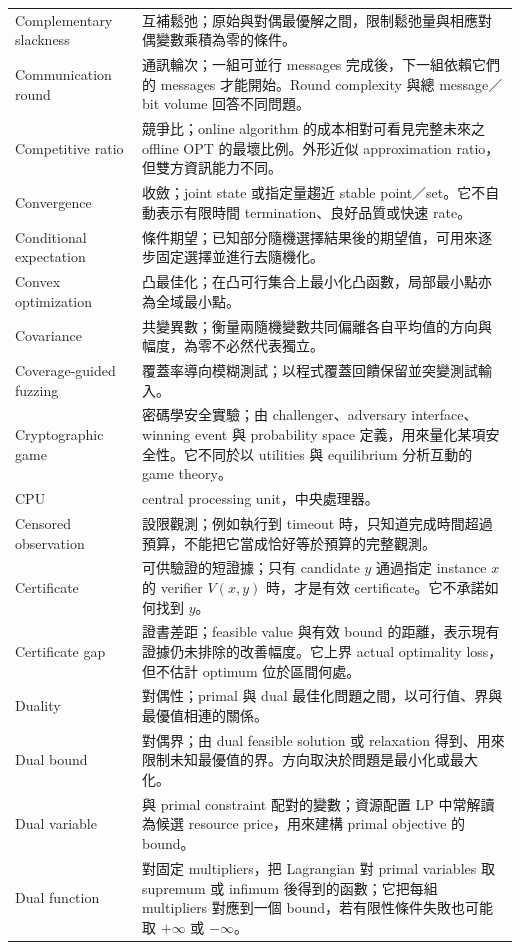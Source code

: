 \documentclass[11pt,a4paper,oneside,openany]{book}
\begin{document}
\begin{longtable}{@{}>{\raggedright\arraybackslash}p{}p{}@{}}
Complementary slackness & 互補鬆弛；原始與對偶最優解之間，限制鬆弛量與相應對偶變數乘積為零的條件。 \\
Communication round & 通訊輪次；一組可並行 messages 完成後，下一組依賴它們的 messages 才能開始。Round complexity 與總 message／bit volume 回答不同問題。 \\
Competitive ratio & 競爭比；online algorithm 的成本相對可看見完整未來之 offline OPT 的最壞比例。外形近似 approximation ratio，但雙方資訊能力不同。 \\
Convergence & 收斂；joint state 或指定量趨近 stable point／set。它不自動表示有限時間 termination、良好品質或快速 rate。 \\
Conditional expectation & 條件期望；已知部分隨機選擇結果後的期望值，可用來逐步固定選擇並進行去隨機化。 \\
Convex optimization & 凸最佳化；在凸可行集合上最小化凸函數，局部最小點亦為全域最小點。 \\
Covariance & 共變異數；衡量兩隨機變數共同偏離各自平均值的方向與幅度，為零不必然代表獨立。 \\
Coverage-guided fuzzing & 覆蓋率導向模糊測試；以程式覆蓋回饋保留並突變測試輸入。 \\
Cryptographic game & 密碼學安全實驗；由 challenger、adversary interface、winning event 與 probability space 定義，用來量化某項安全性。它不同於以 utilities 與 equilibrium 分析互動的 game theory。 \\
CPU & central processing unit，中央處理器。 \\
Censored observation & 設限觀測；例如執行到 timeout 時，只知道完成時間超過預算，不能把它當成恰好等於預算的完整觀測。 \\
Certificate & 可供驗證的短證據；只有 candidate $y$ 通過指定 instance $x$ 的 verifier $V(x,y)$ 時，才是有效 certificate。它不承諾如何找到 $y$。 \\
Certificate gap & 證書差距；feasible value 與有效 bound 的距離，表示現有證據仍未排除的改善幅度。它上界 actual optimality loss，但不估計 optimum 位於區間何處。 \\
Duality & 對偶性；primal 與 dual 最佳化問題之間，以可行值、界與最優值相連的關係。 \\
Dual bound & 對偶界；由 dual feasible solution 或 relaxation 得到、用來限制未知最優值的界。方向取決於問題是最小化或最大化。 \\
Dual variable & 與 primal constraint 配對的變數；資源配置 LP 中常解讀為候選 resource price，用來建構 primal objective 的 bound。 \\
Dual function & 對固定 multipliers，把 Lagrangian 對 primal variables 取 supremum 或 infimum 後得到的函數；它把每組 multipliers 對應到一個 bound，若有限性條件失敗也可能取 $+\infty$ 或 $-\infty$。 \\

\end{longtable}
\end{document}
